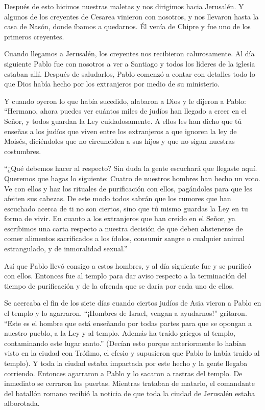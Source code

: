  Después de esto hicimos nuestras maletas y nos dirigimos
hacia Jerusalén.  Y algunos de los creyentes de Cesarea
vinieron con nosotros, y nos llevaron hasta la casa de Nasón, donde
íbamos a quedarnos. Él venía de Chipre y fue uno de los primeros
creyentes.

 Cuando llegamos a Jerusalén, los creyentes nos recibieron
calurosamente.  Al día siguiente Pablo fue con nosotros a
ver a Santiago y todos los líderes de la iglesia estaban allí.
 Después de saludarlos, Pablo comenzó a contar con detalles
todo lo que Dios había hecho por los extranjeros por medio de su
ministerio.

 Y cuando oyeron lo que había sucedido, alabaron a Dios y
le dijeron a Pablo: ``Hermano, ahora puedes ver cuántos miles de judíos
han llegado a creer en el Señor, y todos guardan la Ley cuidadosamente.
 A ellos les han dicho que tú enseñas a los judíos que
viven entre los extranjeros a que ignoren la ley de Moisés, diciéndoles
que no circunciden a sus hijos y que no sigan nuestras costumbres.

 ``¿Qué debemos hacer al respecto? Sin duda la gente
escuchará que llegaste aquí.  Queremos que hagas lo
siguiente: Cuatro de nuestros hombres han hecho un voto. 
Ve con ellos y haz los rituales de purificación con ellos, pagándoles
para que les afeiten sus cabezas. De este modo todos sabrán que los
rumores que han escuchado acerca de ti no son ciertos, sino que tú mismo
guardas la Ley en tu forma de vivir.  En cuanto a los
extranjeros que han creído en el Señor, ya escribimos una carta respecto
a nuestra decisión de que deben abstenerse de comer alimentos
sacrificados a los ídolos, consumir sangre o cualquier animal
estrangulado, y de inmoralidad sexual.''

 Así que Pablo llevó consigo a estos hombres, y al día
siguiente fue y se purificó con ellos. Entonces fue al templo para dar
aviso respecto a la terminación del tiempo de purificación y de la
ofrenda que se daría por cada uno de ellos.

 Se acercaba el fin de los siete días cuando ciertos judíos
de Asia vieron a Pablo en el templo y lo agarraron. 
``¡Hombres de Israel, vengan a ayudarnos!'' gritaron. ``Este es el
hombre que está enseñando por todas partes para que se opongan a nuestro
pueblo, a la Ley y al templo. Además ha traído griegos al templo,
contaminando este lugar santo.''  (Decían esto porque
anteriormente lo habían visto en la ciudad con Trófimo, el efesio y
supusieron que Pablo lo había traído al templo).  Y toda la
ciudad estaba impactada por este hecho y la gente llegaba corriendo.
Entonces agarraron a Pablo y lo sacaron a rastras del templo. De
inmediato se cerraron las puertas.  Mientras trataban de
matarlo, el comandante del batallón romano recibió la noticia de que
toda la ciudad de Jerusalén estaba alborotada.

